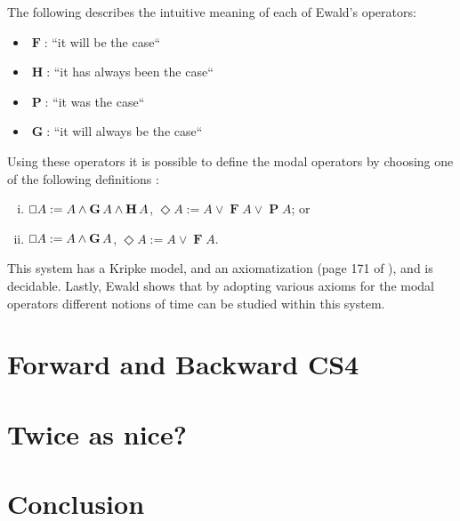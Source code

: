 \documentclass{article}
\renewcommand{\Box}{\oblong}
\newcommand{\F}{\mathop{\textbf{F}}}
\renewcommand{\P}{\mathop{\textbf{P}}}
\newcommand{\G}{\mathop{\textbf{G}}}
\renewcommand{\H}{\mathop{\textbf{H}}}
\begin{document}
The following describes the intuitive meaning of each of Ewald's
operators:
\begin{itemize}
\item[] $\F$: ``it will be the case``  
\item[] $\H$: ``it has always been the case``
\item[] $\P$: ``it was the case``
\item[] $\G$: ``it will always be the case``  
\end{itemize}
Using these operators it is possible to define the  modal
operators by choosing one of the following definitions
\cite{ewald1986}:
\begin{enumerate}[i.]
\item $\Box A := A \land \G A \land \H A$, $\Diamond A := A \lor \F A \lor \P A$; or
\item $\Box A := A \land \G A$, $\Diamond A := A \lor \F A$.
\end{enumerate}

This system has a Kripke model, and an axiomatization (page 171 of \cite{ewald1986}), and is decidable.  Lastly, Ewald shows that by
adopting various axioms for the modal operators different notions of
time can be studied within this system.

\section{Forward and Backward CS4}
\section{Twice as nice?}


\section{Conclusion}



\end{document}
